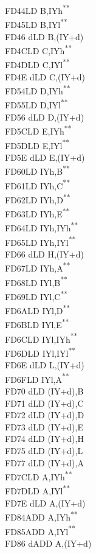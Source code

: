 \documentclass[12pt,twoside,openright,a4paper]{book}
\newcommand{\UNDOC}{\textnormal{\textsuperscript{**}}}
\begin{document}
\begin{multicols}{3}
{\begin{tabbing}
	FD44\>LD B,IYh\UNDOC\\
	FD45\>LD B,IYl\UNDOC\\
	FD46 d\>LD B,(IY+d)\\
	FD4C\>LD C,IYh\UNDOC\\
	FD4D\>LD C,IYl\UNDOC\\
	FD4E d\>LD C,(IY+d)\\
	FD54\>LD D,IYh\UNDOC\\
	FD55\>LD D,IYl\UNDOC\\
	FD56 d\>LD D,(IY+d)\\
	FD5C\>LD E,IYh\UNDOC\\
	FD5D\>LD E,IYl\UNDOC\\
	FD5E d\>LD E,(IY+d)\\
	FD60\>LD IYh,B\UNDOC\\
	FD61\>LD IYh,C\UNDOC\\
	FD62\>LD IYh,D\UNDOC\\
	FD63\>LD IYh,E\UNDOC\\
	FD64\>LD IYh,IYh\UNDOC\\
	FD65\>LD IYh,IYl\UNDOC\\
	FD66 d\>LD H,(IY+d)\\
	FD67\>LD IYh,A\UNDOC\\
	FD68\>LD IYl,B\UNDOC\\
	FD69\>LD IYl,C\UNDOC\\
	FD6A\>LD IYl,D\UNDOC\\
	FD6B\>LD IYl,E\UNDOC\\
	FD6C\>LD IYl,IYh\UNDOC\\
	FD6D\>LD IYl,IYl\UNDOC\\
	FD6E d\>LD L,(IY+d)\\
	FD6F\>LD IYl,A\UNDOC\\
	FD70 d\>LD (IY+d),B\\
	FD71 d\>LD (IY+d),C\\
	FD72 d\>LD (IY+d),D\\
	FD73 d\>LD (IY+d),E\\
	FD74 d\>LD (IY+d),H\\
	FD75 d\>LD (IY+d),L\\
	FD77 d\>LD (IY+d),A\\
	FD7C\>LD A,IYh\UNDOC\\
	FD7D\>LD A,IYl\UNDOC\\
	FD7E d\>LD A,(IY+d)\\
	FD84\>ADD A,IYh\UNDOC\\
	FD85\>ADD A,IYl\UNDOC\\
	FD86 d\>ADD A,(IY+d)\\

\end{tabbing}}
\end{multicols}
\end{document}
